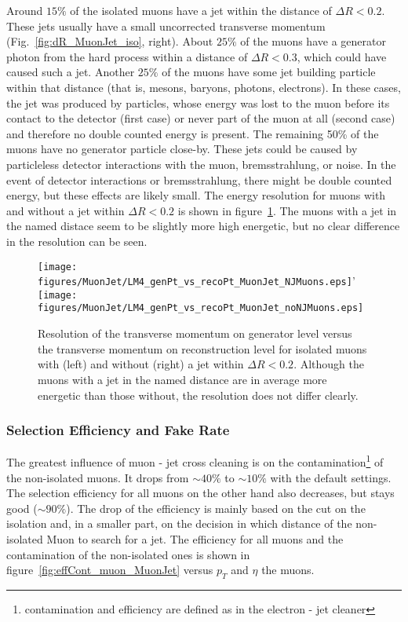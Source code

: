 \documentclass{cmspaper}
\begin{document}
Around \(15\%\) of the isolated muons have a jet within the distance of
\(\Delta R < 0.2\). These jets usually have a small uncorrected transverse
momentum (Fig.~\ref{fig:dR_MuonJet_iso}, right). About \(25\%\) of the muons
have a generator photon from the hard process within a distance of \(\Delta R <
0.3\), which could have caused such a jet. Another \(25\%\) of the muons have
some jet building particle within that distance (that is, mesons, baryons,
photons, electrons). In these cases, the jet was produced by particles, whose
energy was lost to the muon before its contact to the detector (first case) or
never part of the muon at all (second case) and therefore no double counted
energy is present. The remaining 50\% of the muons have no generator particle
close-by. These jets could be caused by particleless detector interactions with
the muon, bremsstrahlung, or noise. In the event of detector interactions or
bremsstrahlung, there might be double counted energy, but these effects are
likely small. The energy resolution for muons with and without a jet within
\(\Delta R < 0.2\) is shown in figure~\ref{fig:genPt_vs_recoPt_isoMuon}. The
muons with a jet in the named distace seem to be slightly more high energetic,
but no clear difference in the resolution can be seen. 

\begin{figure}[hb]
\begin{center}
    \texttt{[image: figures/MuonJet/LM4\_genPt\_vs\_recoPt\_MuonJet\_NJMuons.eps]}'
    \texttt{[image: figures/MuonJet/LM4\_genPt\_vs\_recoPt\_MuonJet\_noNJMuons.eps]}
    \caption{Resolution of the transverse momentum on generator level versus the transverse momentum on reconstruction level for isolated muons with (left) and without (right) a jet within \(\Delta R < 0.2\). Although the muons with a jet in the named distance are in average more energetic than those without, the resolution does not differ clearly.}
\label{fig:genPt_vs_recoPt_isoMuon}
\end{center}
\end{figure}

\subsubsection{Selection Efficiency and Fake Rate}

The greatest influence of muon - jet cross cleaning is on the
contamination\footnote{contamination and efficiency are defined as in the
electron - jet cleaner} of the non-isolated muons. It drops from \(\sim 40 \%\)
to \(\sim 10 \%\) with the default settings. The selection efficiency for all
muons on the other hand also decreases, but stays good (\(\sim 90\%\)). The
drop of the efficiency is mainly based on the cut on the isolation and, in a
smaller part, on the decision in which distance of the non-isolated Muon to
search for a jet. The efficiency for all muons and the contamination of the
non-isolated ones is shown in figure~\ref{fig:effCont_muon_MuonJet} versus 
\(p_T\) and \(\eta\) the muons. 
\end{document}
